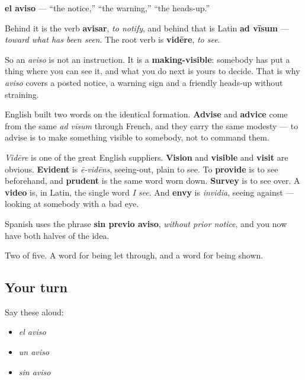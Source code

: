 \begin{cousinweb}
\textbf{el aviso} — \textquotedblleft{}the notice,\textquotedblright{} \textquotedblleft{}the warning,\textquotedblright{} \textquotedblleft{}the heads-up.\textquotedblright{}

Behind it is the verb \textbf{avisar}, \emph{to notify}, and behind that is Latin \textbf{ad vīsum} — \emph{toward what has been seen}. The root verb is \textbf{vidēre}, \emph{to see}.

So an \emph{aviso} is not an instruction. It is a \textbf{making-visible}: somebody has put a thing where you can see it, and what you do next is yours to decide. That is why \emph{aviso} covers a posted notice, a warning sign and a friendly heads-up without straining.

English built two words on the identical formation. \textbf{Advise} and \textbf{advice} come from the same \emph{ad vīsum} through French, and they carry the same modesty — to advise is to make something visible to somebody, not to command them.

\emph{Vidēre} is one of the great English suppliers. \textbf{Vision} and \textbf{visible} and \textbf{visit} are obvious. \textbf{Evident} is \emph{ē-vidēns}, seeing-out, plain to see. To \textbf{provide} is to see beforehand, and \textbf{prudent} is the same word worn down. \textbf{Survey} is to see over. A \textbf{video} is, in Latin, the single word \emph{I see}. And \textbf{envy} is \emph{invidia}, seeing against — looking at somebody with a bad eye.

Spanish uses the phrase \textbf{sin previo aviso}, \emph{without prior notice}, and you now have both halves of the idea.
\end{cousinweb}

\begin{grammarlens}[title={What you've built}]
Two of five. A word for being let through, and a word for being shown.
\end{grammarlens}

\subsection*{Your turn}
Say these aloud:

\begin{itemize}
\raggedright
  \item \emph{el aviso}
  \item \emph{un aviso}
  \item \emph{sin aviso}
\end{itemize}

